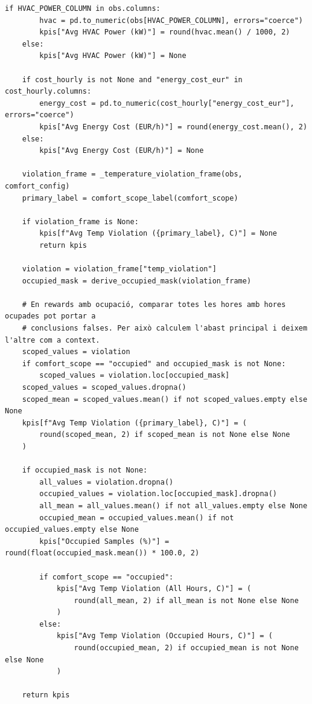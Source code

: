 \documentclass[10pt,a4paper]{article}
\begin{document}
\begin{lstlisting}[style=studioPython,caption={backend/grafics/kpis.py},label={lst:backend-grafics-kpis-py}]
    if HVAC_POWER_COLUMN in obs.columns:
        hvac = pd.to_numeric(obs[HVAC_POWER_COLUMN], errors="coerce")
        kpis["Avg HVAC Power (kW)"] = round(hvac.mean() / 1000, 2)
    else:
        kpis["Avg HVAC Power (kW)"] = None

    if cost_hourly is not None and "energy_cost_eur" in cost_hourly.columns:
        energy_cost = pd.to_numeric(cost_hourly["energy_cost_eur"], errors="coerce")
        kpis["Avg Energy Cost (EUR/h)"] = round(energy_cost.mean(), 2)
    else:
        kpis["Avg Energy Cost (EUR/h)"] = None

    violation_frame = _temperature_violation_frame(obs, comfort_config)
    primary_label = comfort_scope_label(comfort_scope)

    if violation_frame is None:
        kpis[f"Avg Temp Violation ({primary_label}, C)"] = None
        return kpis

    violation = violation_frame["temp_violation"]
    occupied_mask = derive_occupied_mask(violation_frame)

    # En rewards amb ocupació, comparar totes les hores amb hores ocupades pot portar a
    # conclusions falses. Per això calculem l'abast principal i deixem l'altre com a context.
    scoped_values = violation
    if comfort_scope == "occupied" and occupied_mask is not None:
        scoped_values = violation.loc[occupied_mask]
    scoped_values = scoped_values.dropna()
    scoped_mean = scoped_values.mean() if not scoped_values.empty else None
    kpis[f"Avg Temp Violation ({primary_label}, C)"] = (
        round(scoped_mean, 2) if scoped_mean is not None else None
    )

    if occupied_mask is not None:
        all_values = violation.dropna()
        occupied_values = violation.loc[occupied_mask].dropna()
        all_mean = all_values.mean() if not all_values.empty else None
        occupied_mean = occupied_values.mean() if not occupied_values.empty else None
        kpis["Occupied Samples (%)"] = round(float(occupied_mask.mean()) * 100.0, 2)

        if comfort_scope == "occupied":
            kpis["Avg Temp Violation (All Hours, C)"] = (
                round(all_mean, 2) if all_mean is not None else None
            )
        else:
            kpis["Avg Temp Violation (Occupied Hours, C)"] = (
                round(occupied_mean, 2) if occupied_mean is not None else None
            )

    return kpis
\end{lstlisting}
\end{document}
